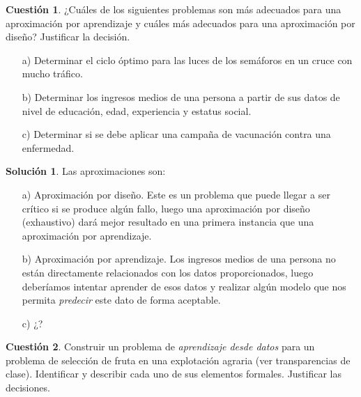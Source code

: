 \documentclass[a4paper, 11pt]{article}
\theoremstyle{definition}
\newtheorem{cuestion}{Cuestión}
\newtheorem*{solucion}{Solución}
\begin{document}
  \begin{cuestion}
    ¿Cuáles de los siguientes problemas son más adecuados para una aproximación por aprendizaje y cuáles más adecuados para una aproximación por diseño? Justificar la decisión.
    \begin{enumerate}
      \item[a)] Determinar el ciclo óptimo para las luces de los semáforos en un cruce con mucho tráfico.
      \item[b)] Determinar los ingresos medios de una persona a partir de sus datos de nivel de educación, edad, experiencia y estatus social.
      \item[c)] Determinar si se debe aplicar una campaña de vacunación contra una enfermedad.
    \end{enumerate}

  \end{cuestion}

  \begin{solucion}
    Las aproximaciones son:
    \begin{enumerate}
      \item[a)] Aproximación por diseño. Este es un problema que puede llegar a ser crítico si se produce algún fallo, luego una aproximación por diseño (exhaustivo) dará mejor resultado en una primera instancia que una aproximación por aprendizaje.
      \item[b)] Aproximación por aprendizaje. Los ingresos medios de una persona no están directamente relacionados con los datos proporcionados, luego deberíamos intentar aprender de esos datos y realizar algún modelo que nos permita \emph{predecir} este dato de forma aceptable.
      \item[c)] ¿?
    \end{enumerate}
  \end{solucion}

  \begin{cuestion}
  Construir un problema de \emph{aprendizaje desde datos} para un problema de selección de fruta en una explotación agraria (ver transparencias de clase). Identificar y describir cada uno de sus elementos formales. Justificar las decisiones.
  \end{cuestion}
\end{document}
